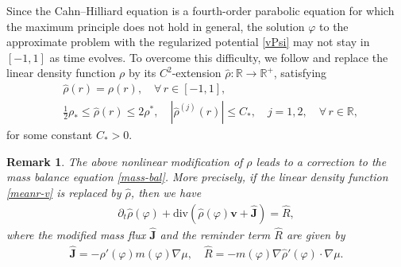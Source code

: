 \documentclass[11pt,reqno]{amsart}
\newtheorem{remark}{\textbf{Remark}}[section]
\def\div{\mathrm{div}}
\def\J{\mathbf{J}}
\def\vv{\bm{v}}
\begin{document}
Since the Cahn--Hilliard equation is a fourth-order parabolic equation for which the maximum principle does not hold in general, the solution $\varphi$ to the approximate problem with the regularized potential \eqref{vPsi} may not stay in $[-1,1]$ as time evolves. To overcome this difficulty, we follow \cite{Frigeri2016} and replace the linear density function $\rho$
by its $C^2$-extension $\widehat{\rho}:\mathbb{R}\rightarrow \mathbb{R}^{+}$, satisfying
%
\begin{align}
& \widehat{\rho }(r)=\rho (r),\quad \forall \,r\in [-1,1],\
\label{apprho1} \\
&  \frac12 \rho_{\ast}\leq \widehat{\rho }(r) \leq 2\rho^{\ast},\quad
| \widehat{\rho }^{(j) }(r)| \leq C_*,\quad j=1,2, \quad \forall\, r\in \mathbb{R},
  \label{apprho2}
\end{align}
%
for some constant $C_*>0$.
%
\begin{remark}\rm
The above nonlinear modification of $\rho$ leads to a correction to the mass balance equation \eqref{mass-bal}.
%
More precisely, if the linear density function \eqref{meanr-v} is replaced by  $\widehat{\rho}$, then we have
%
\begin{align}
 \partial_t \widehat{\rho}(\varphi) + \div( \widehat{\rho}(\varphi) \vv+ \widehat{\J} )= \widehat{R},
 \label{mass-ba2}
\end{align}
%
where the modified mass flux $\widehat{\J}$ and the reminder term $\widehat{R}$ are given by
%
\begin{align}
\widehat{\J}=-\widehat{\rho}'(\varphi)m(\varphi)\nabla\mu, \quad \widehat{R}=-m(\varphi)\nabla \widehat{\rho}'(\varphi)\cdot \nabla \mu.
\label{R}
\end{align}
\end{remark}
%
\end{document}

